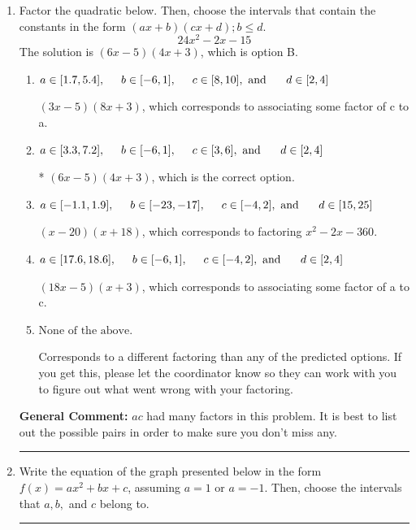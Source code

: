 \documentclass{extbook}[14pt]
\newcommand{\litem}[1]{\item #1

\rule{\textwidth}{0.4pt}}
\begin{document}
\begin{enumerate}\litem{
Factor the quadratic below. Then, choose the intervals that contain the constants in the form $(ax+b)(cx+d); b \leq d.$
\[ 24x^{2} -2 x -15 \]The solution is \( (6x -5)(4x + 3) \), which is option B.\begin{enumerate}[label=\Alph*.]
\item \( a \in [1.7, 5.4], \hspace*{5mm} b \in [-6, 1], \hspace*{5mm} c \in [8, 10], \text{ and } \hspace*{5mm} d \in [2, 4] \)

 $(3x -5)(8x + 3)$, which corresponds to associating some factor of c to a.
\item \( a \in [3.3, 7.2], \hspace*{5mm} b \in [-6, 1], \hspace*{5mm} c \in [3, 6], \text{ and } \hspace*{5mm} d \in [2, 4] \)

* $(6x -5)(4x + 3)$, which is the correct option.
\item \( a \in [-1.1, 1.9], \hspace*{5mm} b \in [-23, -17], \hspace*{5mm} c \in [-4, 2], \text{ and } \hspace*{5mm} d \in [15, 25] \)

 $(x -20)(x + 18)$, which corresponds to factoring $x^{2} -2 x -360$.
\item \( a \in [17.6, 18.6], \hspace*{5mm} b \in [-6, 1], \hspace*{5mm} c \in [-4, 2], \text{ and } \hspace*{5mm} d \in [2, 4] \)

 $(18x -5)(x + 3)$, which corresponds to associating some factor of a to c.
\item \( \text{None of the above.} \)

 Corresponds to a different factoring than any of the predicted options. If you get this, please let the coordinator know so they can work with you to figure out what went wrong with your factoring.
\end{enumerate}

\textbf{General Comment:} $ac$ had many factors in this problem. It is best to list out the possible pairs in order to make sure you don't miss any.
}
\litem{
Write the equation of the graph presented below in the form $f(x)=ax^2+bx+c$, assuming  $a=1$ or $a=-1$. Then, choose the intervals that $a, b,$ and $c$ belong to.

}
\end{enumerate}
\end{document}

